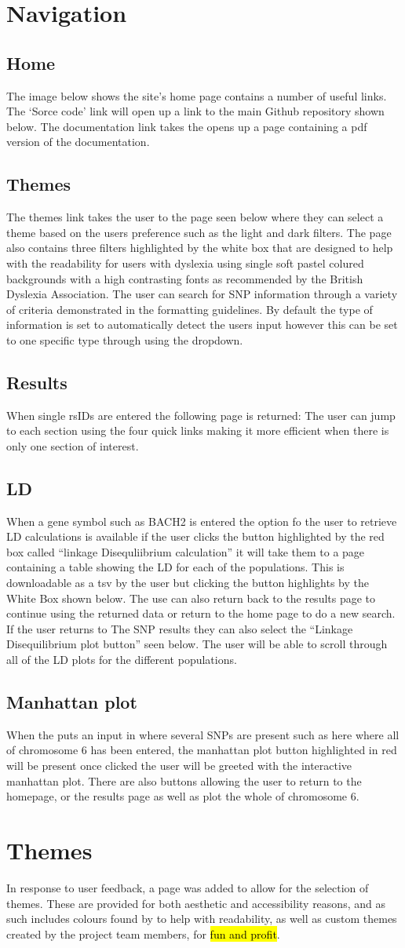 \documentclass[12pt,a4paper]{article}
\newcommand{\sect}[1]{
\clearpage
\hypertarget{#1}{
\section{#1}\label{#1}}
}
\newcommand{\subsect}[1]{
\FloatBarrier %
\hypertarget{#1}{
\subsection{#1}\label{#1}}
}
\begin{document}
\sect{Navigation}
\subsect{Home}
The image below shows the site's home page contains a number of useful links.
The ‘Sorce code’ link will open up a link to the main Github repository shown below. 
The documentation link takes the opens up a page containing a pdf version of the documentation.
\subsect{Themes}
The themes link takes the user to the page seen below where they can select a theme based on the users preference such as the light and dark filters. The page also contains three filters highlighted by the white box that are designed to help with the readability for users with dyslexia using single soft pastel colured backgrounds with a high contrasting fonts as recommended by the British Dyslexia Association.
The user can search for SNP information through a variety of criteria demonstrated in the formatting guidelines. By default the type of information is set to automatically detect the users input however this can be set to one specific type through using the dropdown.
\subsect{Results}
When single rsIDs are entered the following page is returned:
The user can jump to each section using the four quick links making it more efficient when there is only one section of interest.
\subsect{LD}
When a gene symbol such as BACH2 is entered the option fo the user to retrieve LD calculations is available if the user clicks the button highlighted by the red box called “linkage Disequliibrium calculation” it will take them to a page containing a table showing the LD for each of the populations. This is downloadable as a tsv by the user but clicking the button highlights by the White Box shown below.
The use can also return back to the results page to continue using the returned data or return to the home page to do a new search. If the user returns to The SNP results they can also select the “Linkage Disequilibrium plot button” seen below.
The user will be able to scroll through all of the LD plots for the different populations.
\subsect{Manhattan plot}
When the puts an input in where several SNPs are present such as here where all of chromosome 6 has been entered, the manhattan plot button highlighted in red will be present once clicked the user will be greeted with the interactive manhattan plot. There are also buttons allowing the user to return to the homepage, or the results page as well as plot the whole  of chromosome 6.
\sect{Themes}
In response to user feedback, a page was added to allow for the selection of themes.
These are provided for both aesthetic and accessibility reasons,
and as such includes colours found by \textcite{AccessColours} to help with readability,
as well as custom themes created by the project team members, for \hl{fun and profit}.
\end{document}
